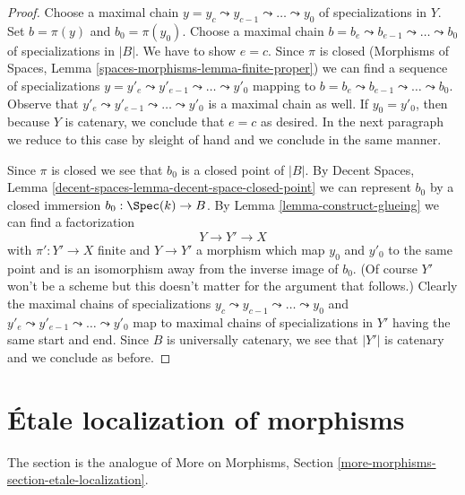 \begin{proof}
\medskip\noindent
Choose a maximal chain
$y = y_c \leadsto y_{c - 1} \leadsto \ldots \leadsto y_0$
of specializations in $Y$.
Set $b = \pi(y)$ and $b_0 = \pi(y_0)$.
Choose a maximal chain
$b = b_e \leadsto b_{e - 1} \leadsto \ldots \leadsto b_0$
of specializations in $|B|$.
We have to show $e = c$.
Since $\pi$ is closed
(Morphisms of Spaces, Lemma \ref{spaces-morphisms-lemma-finite-proper})
we can find a sequence of specializations
$y = y'_e \leadsto y'_{e - 1} \leadsto \ldots \leadsto y'_0$
mapping to
$b = b_e \leadsto b_{e - 1} \leadsto \ldots \leadsto b_0$.
Observe that $y'_e \leadsto y'_{e - 1} \leadsto \ldots \leadsto y'_0$
is a maximal chain as well.
If $y_0 = y'_0$, then because $Y$ is catenary, we conclude
that $e = c$ as desired. In the next paragraph we reduce to
this case by sleight of hand and we conclude in the same manner.

\medskip\noindent
Since $\pi$ is closed we see that $b_0$ is a closed point of $|B|$.
By Decent Spaces, Lemma \ref{decent-spaces-lemma-decent-space-closed-point}
we can represent $b_0$ by a closed immersion $b_0 : \Spec(k) \to B$.
By Lemma \ref{lemma-construct-glueing}
we can find a factorization
$$
Y \to Y' \to X
$$
with $\pi' : Y' \to X$ finite and $Y \to Y'$ a morphism which
map $y_0$ and $y'_0$ to the same point and is an isomorphism
away from the inverse image of $b_0$.
(Of course $Y'$ won't be a scheme but this doesn't matter for the
argument that follows.)
Clearly the maximal chains of specializations
$y_c \leadsto y_{c - 1} \leadsto \ldots \leadsto y_0$ and
$y'_e \leadsto y'_{e - 1} \leadsto \ldots \leadsto y'_0$
map to maximal chains of specializations in $Y'$ having
the same start and end.
Since $B$ is universally catenary, we see that
$|Y'|$ is catenary and we conclude as before.
\end{proof}






\section{\'Etale localization of morphisms}
\label{section-etale-localization}

\noindent
The section is the analogue of
More on Morphisms, Section \ref{more-morphisms-section-etale-localization}.

